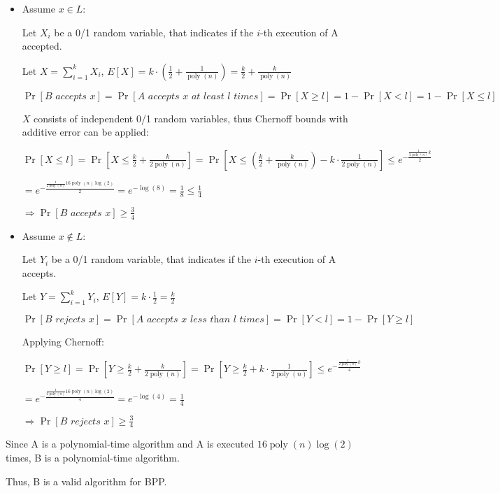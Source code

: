 \begin{itemize}
    \item Assume $x \in L$:

Let $X_i$ be a 0/1 random variable, that indicates if the $i$-th execution of A accepted.

Let $X = \sum\limits_{i=1}^k X_i$,
$E[X] = k \cdot \left( \frac{1}{2} + \frac{1}{\operatorname{poly}(n)} \right) = \frac{k}{2} + \frac{k}{\operatorname{poly}(n)}$

$\operatorname{Pr}[\textit{B accepts } x] 
= \operatorname{Pr}[\textit{A accepts } x \textit{ at least l times}]
= \operatorname{Pr}[X \geq l] 
= 1 - \operatorname{Pr}[X < l]
= 1 - \operatorname{Pr}[X \leq l]$

$X$ consists of independent 0/1 random variables, thus Chernoff bounds with additive error can be applied:

$\operatorname{Pr}[X \leq l]= \operatorname{Pr}\left[X \leq  \frac{k}{2} + \frac{k}{2 \operatorname{poly}(n)}\right]
= \operatorname{Pr}\left[X \leq  \left(\frac{k}{2} + \frac{k}{\operatorname{poly}(n)}\right) - k\cdot\frac{1}{2\operatorname{poly}(n)}\right]
\leq e^{-\frac{\frac{1}{2\operatorname{poly}(n)} k}{2}}
$

$=
e^{-\frac{\frac{1}{2\operatorname{poly}(n)} 16\operatorname{poly}(n)\operatorname{log}(2)}{2}} 
=
e^{-\operatorname{log}(8)}
= \frac{1}{8} \leq \frac{1}{4}$

$\Rightarrow
\operatorname{Pr}[\textit{B accepts } x] \geq \frac{3}{4}$ 

\item Assume $x \notin L$:

Let $Y_i$ be a 0/1 random variable, that indicates if the $i$-th execution of A accepts.

Let $Y = \sum\limits_{i=1}^k Y_i$,
$E[Y] = k \cdot\frac{1}{2} = \frac{k}{2}$

$\operatorname{Pr}[\textit{B rejects } x] 
= \operatorname{Pr}[\textit{A accepts } x \textit{ less than l times}]
= \operatorname{Pr}[Y < l] 
= 1 - \operatorname{Pr}[Y \geq l]$

Applying Chernoff:

$\operatorname{Pr}[Y \geq l]
= \operatorname{Pr}\left[Y \geq \frac{k}{2} + \frac{k}{2 \operatorname{poly}(n)}\right]
= \operatorname{Pr}\left[Y \geq \frac{k}{2} + k\cdot\frac{1}{2\operatorname{poly}(n)}\right]
\leq e^{-\frac{\frac{1}{2\operatorname{poly}(n)} k}{4}}$

$=
e^{-\frac{\frac{1}{2\operatorname{poly}(n)} 16\operatorname{poly}(n)\operatorname{log}(2)}{4}} 
=
e^{-\operatorname{log}(4)}
= \frac{1}{4}$

$\Rightarrow
\operatorname{Pr}[\textit{B rejects } x] \geq \frac{3}{4}$ 

\end{itemize}

Since A is a polynomial-time algorithm and A is executed $16\operatorname{poly}(n)\operatorname{log}(2)$ times, B is a polynomial-time algorithm.

Thus, B is a valid algorithm for BPP.

\pagebreak

